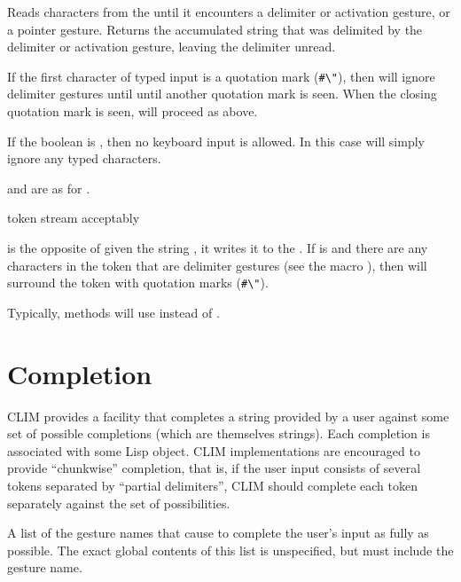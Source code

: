 Reads characters from the   until it
encounters a delimiter or activation gesture, or a pointer gesture.  Returns the
accumulated string that was delimited by the delimiter or activation gesture,
leaving the delimiter unread.

If the first character of typed input is a quotation mark (\verb+#\"+), then
 will ignore delimiter gestures until until another quotation
mark is seen.  When the closing quotation mark is seen,  will
proceed as above.

If the boolean  is , then no keyboard input is
allowed.  In this case  will simply ignore any typed characters.

 and  are as for
.

 {token stream \key acceptably}

 is the opposite of  given the string
, it writes it to the  .  If
 is  and there are any characters in the token that
are delimiter gestures (see the macro ), then
 will surround the token with quotation marks (\verb+#\"+).

Typically,  methods will use  instead of
.


\section {Completion}

CLIM provides a  facility that completes a string provided
by a user against some set of possible completions (which are themselves
strings).  Each completion is associated with some Lisp object.  CLIM
implementations are encouraged to provide ``chunkwise'' completion, that is, if
the user input consists of several tokens separated by ``partial delimiters'',
CLIM should complete each token separately against the set of possibilities.



A list of the gesture names that cause  to complete the
user's input as fully as possible.  The exact global contents of this list is
unspecified, but must include the  gesture name.

